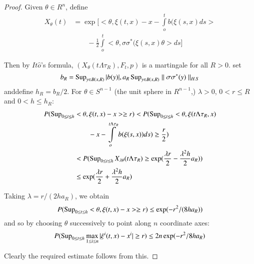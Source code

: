 \begin{proof}
Given $\theta \in R^n$, define
\begin{align*}
X_\theta (t) & = \exp [ < \theta,\xi (t,x)-x-\int \limits^{t}_{o}b (\xi
  (s,x)ds > \\
& \qquad - \frac{1}{2}\int \limits^{t}_{o} < \theta, \sigma
  \sigma^* (\xi(s,x) \theta > ds] 
\end{align*}

Then by $It \hat{o}$'s formula, $(X_\theta (t \Lambda \tau_R), F_t,
p)$ is a martingale for all $R > 0$. set 
$$
b_R = \operatorname{Sup}_{y \in B(x,R)}| b(y)|, a_R \operatorname{Sup}_{y \in B(x,R)}\parallel
\sigma \sigma^* (y) \parallel _{H.S} 
$$
and\pageoriginale define $h_R = b_R /2$. For $\theta \in S^{n-1}$ (the
unit sphere in $R^{n-1}$,) $\lambda > 0$, $0<r \leq R$ and $0 < h \leq
h_R $:  
\begin{align*}
 P ( \operatorname{Sup}_{0 \leq t \leq h} & < \theta, \xi (t,x)-x> \geq r) < P (
 \operatorname{Sup}\limits_{0 \leq t \leq h} < \theta , \xi  
(t \Lambda \tau_R ,x)\\
& \qquad  -x- \int\limits^{t \Lambda \tau_R}_o b(\xi
(s,x))ds) \geq \frac{r}{2}) \\ 
& < P ( \operatorname{Sup}_{0 \leq t \leq h} X_{\lambda \theta}(t \Lambda \tau_R)
\geq \exp (\frac{\lambda r}{2} - \frac{\lambda^2 h}{2}a_R)) \\ 
& \leq \exp (\frac{\lambda r}{2} + \frac{\lambda^2 h}{2}a_R)  
\end{align*}

Taking $\lambda = r/(2ha_R)$, we obtain
$$
P(\operatorname{Sup}_{0 \leq t \leq h}< \theta , \xi (t,x)-x > \geq r) \leq \exp
(-r^2 / (8ha_R)) 
$$
and so by choosing $\theta $ successively to point along $n$
coordinate axes: 
$$
P(\operatorname{Sup}_{0 \leq t \leq h} \max_{1 \leq i \leq n}| \xi^i (t,x)-x^i |
\geq r) \leq 2n \exp (- r^2/8ha_R) 
$$

Clearly the required estimate follows from this.
\end{proof}

